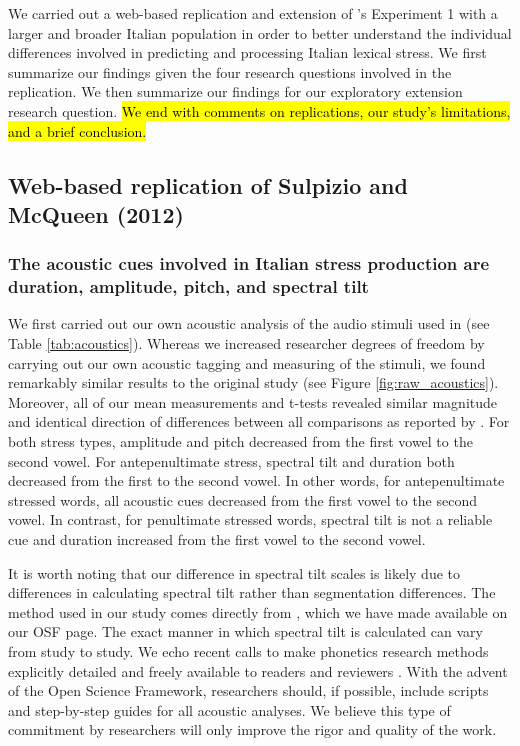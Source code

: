 We carried out a web-based replication and extension of \cite{Sulpizio_McQueen_2012}'s Experiment 1 with a larger and broader Italian population in order to better understand the individual differences involved in predicting and processing Italian lexical stress. We first summarize our findings given the four research questions involved in the replication. We then summarize our findings for our exploratory extension research question. \hl{We end with comments on replications, our study's limitations, and a brief conclusion.}

\subsection{Web-based replication of Sulpizio and McQueen (2012)}
\subsubsection{The acoustic cues involved in Italian stress production are duration, amplitude, pitch, and spectral tilt}
We first carried out our own acoustic analysis of the audio stimuli used in \cite{Sulpizio_McQueen_2012} (see Table \ref{tab:acoustics}). Whereas we increased researcher degrees of freedom \citep{Corretta2023, roettger2019researcher} by carrying out our own acoustic tagging and measuring of the stimuli, we found remarkably similar results to the original study (see Figure \ref{fig:raw_acoustics}). Moreover, all of our mean measurements and t-tests revealed similar magnitude and identical direction of differences between all comparisons as reported by \cite{Sulpizio_McQueen_2012}. For both stress types, amplitude and pitch decreased from the first vowel to the second vowel. For antepenultimate stress, spectral tilt and duration both decreased from the first to the second vowel. In other words, for antepenultimate stressed words, all acoustic cues decreased from the first vowel to the second vowel. In contrast, for penultimate stressed words, spectral tilt is not a reliable cue and duration increased from the first vowel to the second vowel.

It is worth noting that our difference in spectral tilt scales is likely due to differences in calculating spectral tilt rather than segmentation differences. The method used in our study comes directly from \cite{sluijter1996spectral,cutler2007dutch}, which we have made available on our OSF page. The exact manner in which spectral tilt is calculated can vary from study to study. We echo recent calls to make phonetics research methods explicitly detailed and freely available to readers and reviewers \citep{roettger2019emergent, roettger2019researcher}. With the advent of the Open Science Framework, researchers should, if possible, include scripts and step-by-step guides for all acoustic analyses. We believe this type of commitment by researchers will only improve the rigor and quality of the work.

